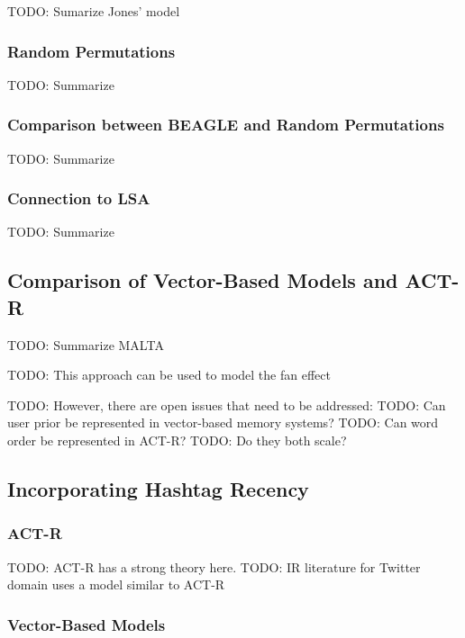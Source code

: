 \documentclass[man]{apa6}
\begin{document}
TODO: Sumarize Jones' model \cite{Jones2007}

\subsubsection{Random Permutations}

TODO: Summarize \cite{Sahlgren2008}

\subsubsection{Comparison between BEAGLE and Random Permutations}

TODO: Summarize \cite{Recchia2010}

\subsubsection{Connection to LSA}

TODO: Summarize \cite{Kanerva2000}

\subsection{Comparison of Vector-Based Models and ACT-R}

TODO: Summarize MALTA \cite{Rutledge2007}

TODO: This approach can be used to model the fan effect \cite{Rutledge2008} 

TODO: However, there are open issues that need to be addressed:
TODO: Can user prior be represented in vector-based memory systems?
TODO: Can word order be represented in ACT-R?
TODO: Do they both scale?

\subsection{Incorporating Hashtag Recency}

\subsubsection{ACT-R}

TODO: ACT-R has a strong theory here.
TODO: IR literature for Twitter domain uses a model similar to ACT-R \cite{Efron2011}

\subsubsection{Vector-Based Models}
\end{document}
